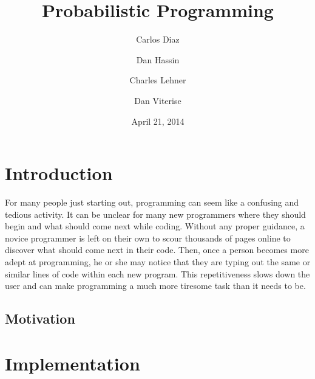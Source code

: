 \documentclass{article}
\title{
Probabilistic Programming
}
\author{
	Carlos Diaz
	\and
	Dan Hassin
	\and
	Charles Lehner
	\and
	Dan Viterise
}
\date{April 21, 2014}
\begin{document}
\maketitle


\section{Introduction}
For many people just starting out, programming can seem like a confusing and tedious activity. It can be unclear for 
many new programmers where they should begin and what should come next while coding. Without any proper guidance, 
a novice programmer is left on their own to scour thousands of pages online to discover what should come next in 
their code. Then, once a person becomes more adept at programming, he or she may notice that they are typing out 
the same or similar lines of code within each new program. This repetitiveness slows down the user and can make 
programming a much more tiresome task than it needs to be. 
\subsection{Motivation}


\section{Implementation}
\end{document}
